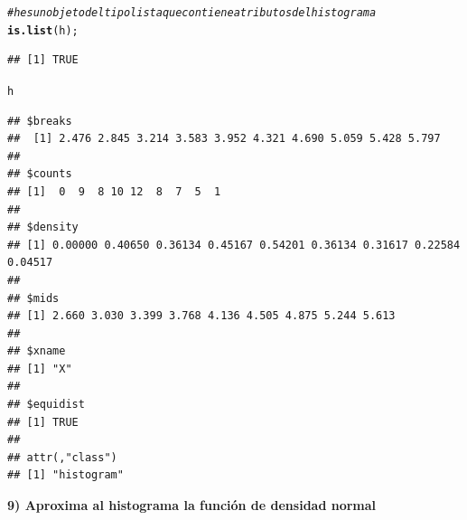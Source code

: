 \documentclass[12pt,letterpaper]{article}\usepackage[]{graphicx}\usepackage[]{color}
\makeatletter
\newcommand{\hlcom}[1]{\textcolor[rgb]{0.678,0.584,0.686}{\textit{#1}}}%
\newcommand{\hlstd}[1]{\textcolor[rgb]{0.345,0.345,0.345}{#1}}%
\newcommand{\hlkwd}[1]{\textcolor[rgb]{0.737,0.353,0.396}{\textbf{#1}}}%
\newenvironment{kframe}{%
 \def\at@end@of@kframe{}%
 \ifinner\ifhmode%
  \def\at@end@of@kframe{\end{minipage}}%
  \begin{minipage}{\columnwidth}%
 \fi\fi%
 \def\FrameCommand##1{\hskip\@totalleftmargin \hskip-\fboxsep
 \colorbox{shadecolor}{##1}\hskip-\fboxsep
     \hskip-\linewidth \hskip-\@totalleftmargin \hskip\columnwidth}%
 \MakeFramed {\advance\hsize-\width
   \@totalleftmargin\z@ \linewidth\hsize
   \@setminipage}}%
 {\par\unskip\endMakeFramed%
 \at@end@of@kframe}
\newenvironment{knitrout}{}{} %
\makeatother
\begin{document}
\begin{knitrout}
\begin{kframe}\begin{alltt}
\hlcom{# h es un objeto del tipo lista que contiene atributos del histograma}
\hlkwd{is.list}\hlstd{(h);}
\end{alltt}
\begin{verbatim}
## [1] TRUE
\end{verbatim}
\begin{alltt}
\hlstd{h}
\end{alltt}
\begin{verbatim}
## $breaks
##  [1] 2.476 2.845 3.214 3.583 3.952 4.321 4.690 5.059 5.428 5.797
## 
## $counts
## [1]  0  9  8 10 12  8  7  5  1
## 
## $density
## [1] 0.00000 0.40650 0.36134 0.45167 0.54201 0.36134 0.31617 0.22584 0.04517
## 
## $mids
## [1] 2.660 3.030 3.399 3.768 4.136 4.505 4.875 5.244 5.613
## 
## $xname
## [1] "X"
## 
## $equidist
## [1] TRUE
## 
## attr(,"class")
## [1] "histogram"
\end{verbatim}
\end{kframe}
\end{knitrout}
\textbf{9) Aproxima al histograma la funci\'on de densidad normal}
\end{document}
